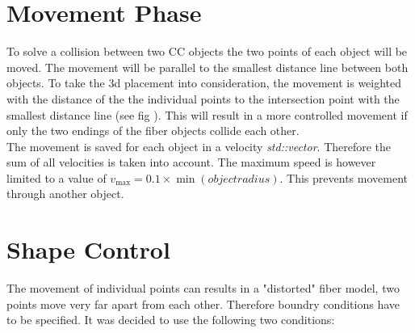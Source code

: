 \section{Movement Phase}
To solve a collision between two \ac{CC} objects the two points of each object will be moved.
The movement will be parallel to the smallest distance line between both objects.
To take the 3d placement into consideration, the movement is weighted with the distance of the the individual points to the intersection point with the smallest distance line (see fig \dummy).
This will result in a more controlled movement if \eg only the two endings of the fiber objects collide each other. \\
% 
The movement is saved for each object in a velocity \textit{std::vector}.
Therefore the sum of all velocities is taken into account.
The maximum speed is however limited to a value of $v_{\max} = 0.1 \times \min(\mathit{object radius})$.
This prevents movement through another object.
% 
\section{Shape Control}\label{chap5:ShapeControl}
The movement of individual points can results in a "distorted" fiber model, \eg two points move very far apart from each other.
Therefore boundry conditions have to be specified.
It was decided to use the following two conditions:
% 
